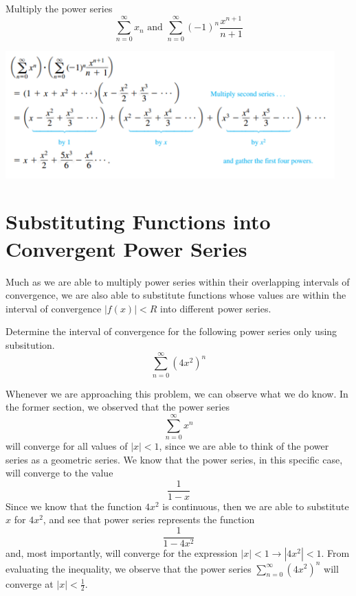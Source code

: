 \begin{remark*}[1]
  Multiply the power series
  \[ \sum_{n=0}^{\infty} x_{n} \textrm{ and } \sum_{n=0}^{\infty}
  (-1)^{n} \frac{x^{n+1}}{n+1} \]
\end{remark*}
\begin{center}
  \includegraphics[width = 0.95\textwidth]{./img/thm19ex.png}

\end{center}

\section{Substituting Functions into Convergent Power Series}
Much as we are able to multiply power series within
their overlapping intervals of convergence,
we are also able to substitute functions whose values are
within the interval of convergence $ |f(x)| < R $ into
different power series.

\begin{center}
\end{center}

\begin{remark*}
  Determine the interval of convergence for the following
  power series only using subsitution.
  \[ \sum_{n=0}^{\infty} (4x^{2})^{n}\]
\end{remark*}
Whenever we are approaching this problem, we can observe
what we do know. In the former section, we observed that the
power series
\[ \sum_{n=0}^{\infty} x^{n} \]
will converge for all values of $ |x| < 1 $, since we
are able to think of the power series as a geometric series.
We know that the power series, in this specific case,
will converge to the value
\[ \frac{1}{1-x}\]
Since we know that the function $ 4x^{2}$ is continuous,
then we are able to substitute $ x $ for $ 4x^{2}$, and see
that power series represents the function
\[ \frac{1}{1-4x^{2}}\] and, most importantly,
will converge for the expression $ |x| < 1 \to |4x^{2}| < 1 $.
From evaluating the inequality, we observe that the power series $ \sum_{n=0}^{\infty} (4x^{2})^{n}$
will converge at $ |x| < \frac{1}{2}$.

